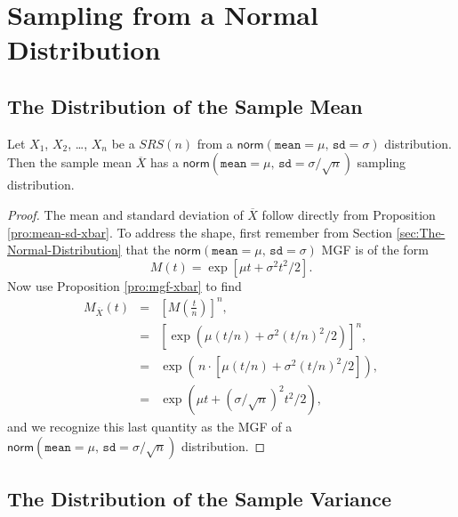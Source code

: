 \documentclass[captions=tableheading]{scrbook}
\begin{document}
\section{Sampling from a Normal Distribution}
\label{sec-8-2}

\label{sec:sampling-from-normal-dist}
\subsection{The Distribution of the Sample Mean}
\label{sec-8-2-1}

\label{sub:samp-mean-dist-of}

\begin{prop}
Let \(X_{1}\), \(X_{2}\), \ldots{}, \(X_{n}\) be a \(SRS(n)\) from a \(\mathsf{norm}(\mathtt{mean}=\mu,\,\mathtt{sd}=\sigma)\) distribution. Then the sample mean \(\overline{X}\) has a \(\mathsf{norm}(\mathtt{mean}=\mu,\,\mathtt{sd}=\sigma/\sqrt{n})\) sampling distribution.
\end{prop}

\begin{proof}
The mean and standard deviation of \(\overline{X}\) follow directly from Proposition \ref{pro:mean-sd-xbar}. To address the shape, first remember from Section \ref{sec:The-Normal-Distribution} that the \(\mathsf{norm}(\mathtt{mean}=\mu,\,\mathtt{sd}=\sigma)\) MGF is of the form
\[
M(t)=\exp\left[ \mu t+\sigma^{2}t^{2}/2\right] .
\]
Now use Proposition \ref{pro:mgf-xbar} to find
\begin{eqnarray*}
M_{\overline{X}}(t) & = & \left[M\left(\frac{t}{n}\right)\right]^{n},\\
 & = & \left[\exp\left( \mu(t/n)+\sigma^{2}(t/n)^{2}/2\right) \right]^{n},\\
 & = & \exp\left( \, n\cdot\left[\mu(t/n)+\sigma^{2}(t/n)^{2}/2\right]\right) ,\\
 & = & \exp\left( \mu t+(\sigma/\sqrt{n})^{2}t^{2}/2\right),
\end{eqnarray*}
and we recognize this last quantity as the MGF of a \(\mathsf{norm}(\mathtt{mean}=\mu,\,\mathtt{sd}=\sigma/\sqrt{n})\) distribution.
\end{proof}
\subsection{The Distribution of the Sample Variance}
\label{sec-8-2-2}

\label{sub:Samp-Var-Dist}
\end{document}
